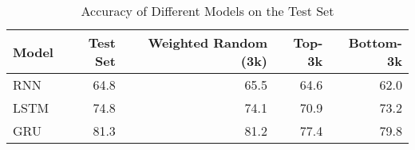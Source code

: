 \begin{table}
\centering
\caption{Accuracy of Different Models on the Test Set}
\label{model_comparison}
\begin{tabular}{lrrrr}
\toprule
Model & Test Set & Weighted Random (3k) & Top-3k & Bottom-3k \\
\midrule
RNN & 64.8 & 65.5 & 64.6 & 62.0 \\
LSTM & 74.8 & 74.1 & 70.9 & 73.2 \\
GRU & 81.3 & 81.2 & 77.4 & 79.8 \\
\bottomrule
\end{tabular}
\end{table}
